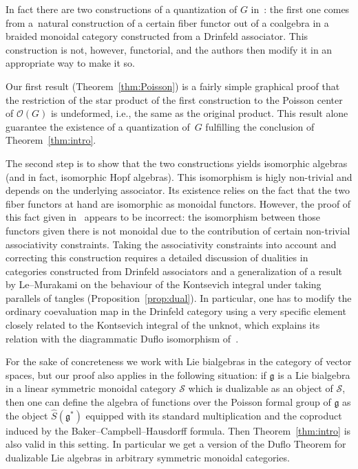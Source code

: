 \documentclass[10pt,a4paper]{amsart}
\numberwithin{equation}{section}
\newcommand{\mf}[1]{\mathfrak{#1}}
\newcommand{\cO}{\mathcal O}
\newcommand{\cS}{\mathcal {S}}
\theoremstyle{definition}
\begin{document}
In fact there are two constructions of a quantization of $G$ in~\cite{Etingof1996}: the f\/irst one comes from a~natural construction of a certain f\/iber functor out of a coalgebra in a braided monoidal category constructed from a Drinfeld associator. This construction is not, however, functorial, and the authors then modify it in an appropriate way to make it so.

Our f\/irst result (Theorem~\ref{thm:Poisson}) is a fairly simple graphical proof that the restriction of the star product of the f\/irst construction to the Poisson center of $\cO(G)$ is undeformed, i.e., the same as the original product. This result alone guarantee the existence of a quantization of~$G$ fulf\/illing the conclusion of Theorem~\ref{thm:intro}.

The second step is to show that the two constructions yields isomorphic algebras (and in fact, isomorphic Hopf algebras). This isomorphism is higly non-trivial and depends on the underlying associator. Its existence relies on the fact that the two f\/iber functors at hand are isomorphic as monoidal functors. However, the proof of this fact given in~\cite{Etingof1996} appears to be incorrect: the isomorphism between those functors given there is not monoidal due to the contribution of certain non-trivial associativity constraints. Taking the associativity constraints into account and correcting this construction requires a detailed discussion of dualities in categories constructed from Drinfeld associators and a generalization of a result by Le--Murakami on the behaviour of the Kontsevich integral under taking parallels of tangles (Proposition~\ref{prop:dual}). In particular, one has to modify the ordinary coevaluation map in the Drinfeld category using a very specif\/ic element closely related to the Kontsevich integral of the unknot, which explains its relation with the diagrammatic Duf\/lo isomorphism of~\cite{MR1988280}.

For the sake of concreteness we work with Lie bialgebras in the category of vector spaces, but our proof also applies in the following situation: if $\mf g$ is a Lie bialgebra in a linear symmetric monoidal category $\cS$ which is dualizable as an object of $\cS$, then one can def\/ine the algebra of functions over the Poisson formal group of $\mf g$ as the object $\widehat{S}(\mf g^*)$ equipped with its standard multiplication and the coproduct induced by the Baker--Campbell--Hausdorf\/f formula. Then Theorem~\ref{thm:intro} is also valid in this setting. In particular we get a version of the Duf\/lo Theorem for dualizable Lie algebras in arbitrary symmetric monoidal categories.
\end{document}
